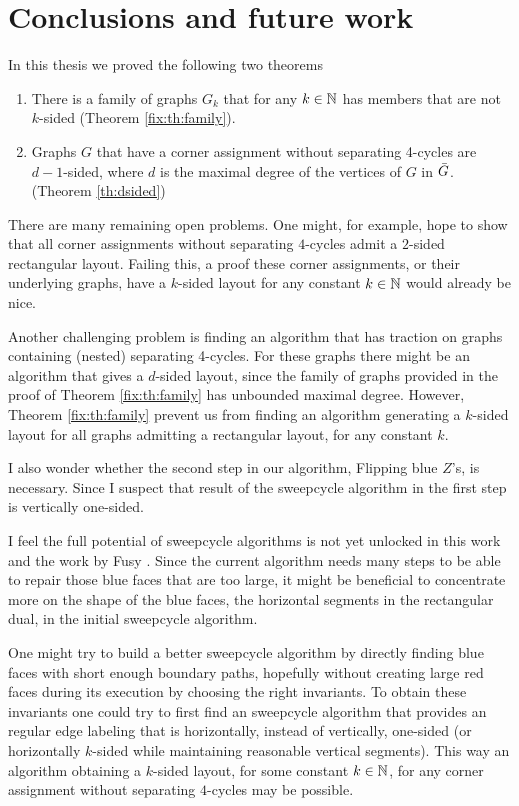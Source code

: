 
\thispagestyle{plain}
\section{Conclusions and future work}

In this thesis we proved the following two theorems

\begin{enumerate}
  \item There is a family of graphs $G_k$ that for any $k \in \mathbb{N}$ has members that are not $k$-sided (Theorem \ref{fix:th:family}).
  \item Graphs $G$ that have a corner assignment without separating 4-cycles are $d-1$-sided, where $d$ is the maximal degree of the vertices of $G$ in $\bar{G}$. (Theorem \ref{th:dsided})
\end{enumerate}

There are many remaining open problems.
One might, for example, hope to show that all corner assignments without separating $4$-cycles admit a $2$-sided rectangular layout. Failing this, a proof these corner assignments, or their underlying graphs, have a $k$-sided layout for any constant $k\in \mathbb{N}$ would already be nice.

Another challenging problem is finding an algorithm that has traction on graphs containing (nested) separating 4-cycles.
For these graphs there might be an algorithm that gives a $d$-sided layout, since the family of graphs provided in the proof of Theorem \ref{fix:th:family} has unbounded maximal degree.
However, Theorem \ref{fix:th:family} prevent us from finding an algorithm generating a $k$-sided layout for all graphs admitting a rectangular layout, for any constant $k$.

I also wonder whether the second step in our algorithm, Flipping blue $Z$'s, is necessary.
Since I suspect that result of the sweepcycle algorithm in the first step is vertically one-sided.

I feel the full potential of sweepcycle algorithms is not yet unlocked in this work and the work by Fusy \cite{Fusy2006}.
Since the current algorithm needs many steps to be able to repair those blue faces that are too large, it might be beneficial to concentrate more on the shape of the blue faces, the horizontal segments in the rectangular dual, in the initial sweepcycle algorithm.

One might try to build a better sweepcycle algorithm by directly finding blue faces with short enough boundary paths, hopefully without creating large red faces during its execution by choosing the right invariants.
To obtain these invariants one could try to first find an sweepcycle algorithm that provides an regular edge labeling that is horizontally, instead of vertically, one-sided (or horizontally $k$-sided while maintaining reasonable vertical segments).
This way an algorithm obtaining a $k$-sided layout, for some constant $k \in \mathbb{N}$, for any corner assignment without separating $4$-cycles may be possible.

